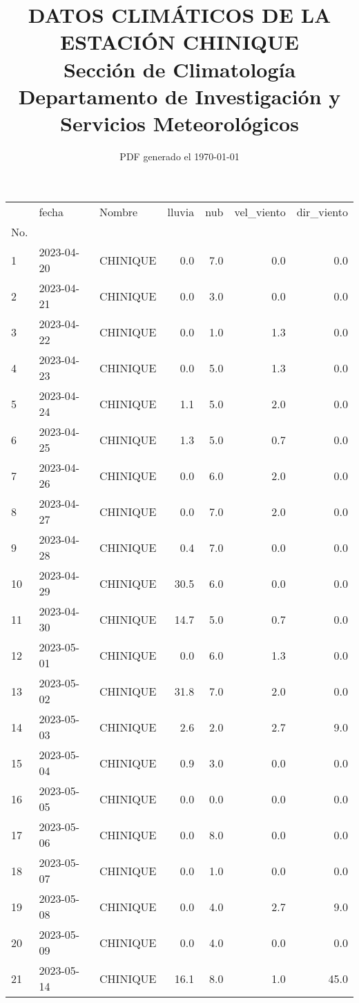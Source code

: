 \documentclass[12pt]{article}
\title{DATOS CLIMÁTICOS DE LA ESTACIÓN CHINIQUE\\
        \LARGE{Sección de Climatología}\\
        \LARGE{Departamento de Investigación y Servicios Meteorológicos}}
\date{PDF generado el \today}
\newcommand\BackgroundPic{\put(0,0){\parbox[b][\paperheight]{\paperwidth}{\vfill\centering\texttt{[image: logo.pdf]}\vfill}}}
\begin{document}
 
        \AddToShipoutPicture*{\BackgroundPic}
        \maketitle
        \begin{center}
       \begin{tabular}{lllrrrr}
\toprule
{} &      fecha &    Nombre &  lluvia &  nub &  vel\_viento &  dir\_viento \\
No. &            &           &         &      &             &             \\
\midrule
1   & 2023-04-20 &  CHINIQUE &     0.0 &  7.0 &         0.0 &         0.0 \\
2   & 2023-04-21 &  CHINIQUE &     0.0 &  3.0 &         0.0 &         0.0 \\
3   & 2023-04-22 &  CHINIQUE &     0.0 &  1.0 &         1.3 &         0.0 \\
4   & 2023-04-23 &  CHINIQUE &     0.0 &  5.0 &         1.3 &         0.0 \\
5   & 2023-04-24 &  CHINIQUE &     1.1 &  5.0 &         2.0 &         0.0 \\
6   & 2023-04-25 &  CHINIQUE &     1.3 &  5.0 &         0.7 &         0.0 \\
7   & 2023-04-26 &  CHINIQUE &     0.0 &  6.0 &         2.0 &         0.0 \\
8   & 2023-04-27 &  CHINIQUE &     0.0 &  7.0 &         2.0 &         0.0 \\
9   & 2023-04-28 &  CHINIQUE &     0.4 &  7.0 &         0.0 &         0.0 \\
10  & 2023-04-29 &  CHINIQUE &    30.5 &  6.0 &         0.0 &         0.0 \\
11  & 2023-04-30 &  CHINIQUE &    14.7 &  5.0 &         0.7 &         0.0 \\
12  & 2023-05-01 &  CHINIQUE &     0.0 &  6.0 &         1.3 &         0.0 \\
13  & 2023-05-02 &  CHINIQUE &    31.8 &  7.0 &         2.0 &         0.0 \\
14  & 2023-05-03 &  CHINIQUE &     2.6 &  2.0 &         2.7 &         9.0 \\
15  & 2023-05-04 &  CHINIQUE &     0.9 &  3.0 &         0.0 &         0.0 \\
16  & 2023-05-05 &  CHINIQUE &     0.0 &  0.0 &         0.0 &         0.0 \\
17  & 2023-05-06 &  CHINIQUE &     0.0 &  8.0 &         0.0 &         0.0 \\
18  & 2023-05-07 &  CHINIQUE &     0.0 &  1.0 &         0.0 &         0.0 \\
19  & 2023-05-08 &  CHINIQUE &     0.0 &  4.0 &         2.7 &         9.0 \\
20  & 2023-05-09 &  CHINIQUE &     0.0 &  4.0 &         0.0 &         0.0 \\
21  & 2023-05-14 &  CHINIQUE &    16.1 &  8.0 &         1.0 &        45.0 \\
\bottomrule
\end{tabular}

        
        \end{center}
        
\end{document}

